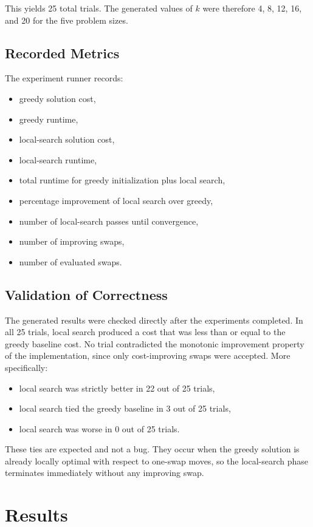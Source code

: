 \documentclass[11pt]{article}
\begin{document}
This yields 25 total trials. The generated values of $k$ were therefore 4, 8, 12, 16, and 20 for the five problem sizes.

\subsection{Recorded Metrics}
The experiment runner records:
\begin{itemize}
    \item greedy solution cost,
    \item greedy runtime,
    \item local-search solution cost,
    \item local-search runtime,
    \item total runtime for greedy initialization plus local search,
    \item percentage improvement of local search over greedy,
    \item number of local-search passes until convergence,
    \item number of improving swaps,
    \item number of evaluated swaps.
\end{itemize}

\subsection{Validation of Correctness}
The generated results were checked directly after the experiments completed. In all 25 trials, local search produced a cost that was less than or equal to the greedy baseline cost. No trial contradicted the monotonic improvement property of the implementation, since only cost-improving swaps were accepted. More specifically:
\begin{itemize}
    \item local search was strictly better in 22 out of 25 trials,
    \item local search tied the greedy baseline in 3 out of 25 trials,
    \item local search was worse in 0 out of 25 trials.
\end{itemize}

These ties are expected and not a bug. They occur when the greedy solution is already locally optimal with respect to one-swap moves, so the local-search phase terminates immediately without any improving swap.

\section{Results}
\end{document}
